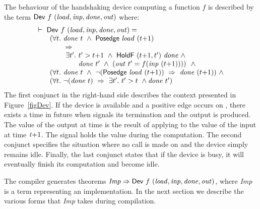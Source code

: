 \documentclass{llncs}
\begin{document}
The behaviour of the handshaking device computing a function $f$ is described by the term 
$\DEF{Dev}\ f\ \VAR{(load,inp,done,out)}$ where:
\[
\begin{array}{l}
\TURNST\ \DEF{Dev}\ f\ \VAR{(load,inp,done,out)} = \\
~~\quad     (\forall t.\ \VAR{done}\ t\ \AND\ \DEF{Posedge}\ \VAR{load}\ (t{+}1)\ \\
\phantom{~~\quad     (\forall t.~} \IMP \\
\phantom{~~\quad     (\forall t.\ ~ } \exists t'.\ t' > t{+}1\ \AND\ \DEF{HoldF}\ (t{+}1,t')\ \VAR{done}\ \AND \\
\phantom{~~\quad     (\forall t.\ ~ \exists t'.\ }  \VAR{done}\ t'\ \AND\ (\VAR{out}\ t' = f (\VAR{inp}\ (t{+}1))))\ ~  \AND \\
~~\quad (\forall t.\ \VAR{done}\ t\ \AND\ \NOT(\DEF{Posedge}\ \VAR{load}\ (t{+}1))\ \IMP\  \VAR{done}\ (t{+}1)) ~\AND \\
~~\quad (\forall t.\ \NOT(\VAR{done}\ t)\ \IMP\ \exists t'.\ t' > t\ \AND \VAR{done}\ t')\\
\end{array}
\]
The first conjunct in the right-hand side describes the context presented
in Figure~\ref{figDev}. If the device is available and a positive
edge occurs on , there exists a time  in future
when  signals its termination and the output is produced.
The value of the output at time  is the result
of applying  to the value of the input at time $\mathit{t}{+}1$.
The signal  holds the value  during the computation.
The second conjunct specifies the situation where no call
is made on  and the device simply remains idle.
Finally, the last conjunct states that if the device
is busy, it will eventually finish its computation
and become idle.

The compiler generates theorems ${\it{Imp}}
\Rightarrow \mathsf{Dev}\ f\ \mathit{(load,inp,done,out)}$, where {\it{Imp}}
is a term representing an implementation. In the next section we
describe the various forms that {\it{Imp}} takes during compilation.


\end{document}

